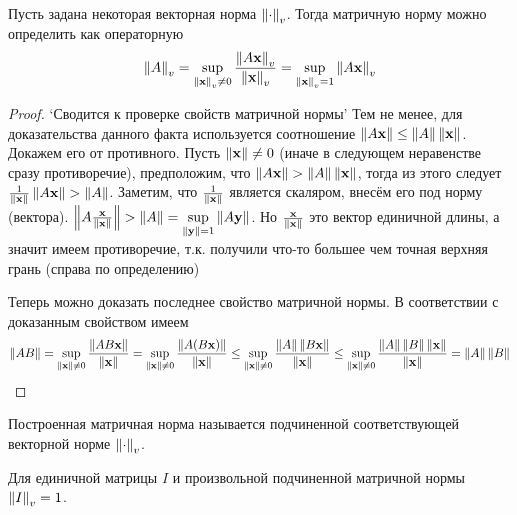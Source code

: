 \begin{lemma}
  Пусть задана некоторая векторная норма $\left\lVert\cdot\right\rVert_v$. Тогда матричную норму можно определить как операторную
  $$
    \left\lVert A\right\rVert_v = \sup_{\left\lVert\mathbf{x}\right\rVert_{v} \neq 0} \frac{\left\lVert A \mathbf{x}\right\rVert_v}{\left\lVert\mathbf{x}\right\rVert_{v}} = \sup_{\left\lVert\mathbf{x}\right\rVert_{v} = 1} \left\lVert A \mathbf{x}\right\rVert_v
  $$
  \begin{proof}
    `Сводится к проверке свойств матричной нормы'
    Тем не менее, для доказательства данного факта используется соотношение $\left\lVert A\mathbf{x}\right\rVert \le \left\lVert A\right\rVert\left\lVert\mathbf{x}\right\rVert$. Докажем его от противного. Пусть $\left\lVert\mathbf{x}\right\rVert \neq 0$ (иначе в следующем неравенстве сразу противоречие), предположим, что $\left\lVert A\mathbf{x}\right\rVert > \left\lVert A\right\rVert\left\lVert\mathbf{x}\right\rVert$, тогда из этого следует $\frac{1}{\left\lVert\mathbf{x}\right\rVert} \left\lVert A\mathbf{x}\right\rVert > \left\lVert A\right\rVert$. Заметим, что $\frac{1}{\left\lVert\mathbf{x}\right\rVert}$ является скаляром, внесём его под норму (вектора). $\left\lVert A \frac{\mathbf{x}}{\left\lVert\mathbf{x}\right\rVert}\right\rVert > \left\lVert A\right\rVert = \sup\limits_{\left\lVert\mathbf{y}\right\rVert = 1} \left\lVert A \mathbf{y}\right\rVert $. Но $\frac{\mathbf{x}}{\left\lVert\mathbf{x}\right\rVert} $ это вектор единичной длины, а значит имеем противоречие, т.к. получили что-то большее чем точная верхняя грань (справа по определению)

    Теперь можно доказать последнее свойство матричной нормы. В соответствии с доказанным свойством имеем
    $$
      \left\lVert AB\right\rVert =
      \sup_{\left\lVert\mathbf{x}\right\rVert \neq 0} \frac{\left\lVert AB \mathbf{x}\right\rVert}{\left\lVert\mathbf{x}\right\rVert} =
      \sup_{\left\lVert\mathbf{x}\right\rVert \neq 0} \frac{\left\lVert A(B\mathbf{x})\right\rVert}{\left\lVert\mathbf{x}\right\rVert} \le
      \sup_{\left\lVert\mathbf{x}\right\rVert \neq 0} \frac{\left\lVert A\right\rVert \left\lVert B\mathbf{x}\right\rVert}{\left\lVert\mathbf{x}\right\rVert} \le
      \sup_{\left\lVert\mathbf{x}\right\rVert \neq 0} \frac{\left\lVert A\right\rVert\left\lVert B\right\rVert \left\lVert\mathbf{x}\right\rVert}{\left\lVert\mathbf{x}\right\rVert} =
      \left\lVert A\right\rVert\left\lVert B\right\rVert
    $$
  \end{proof}
\end{lemma}

\begin{definition}
  Построенная матричная норма называется подчиненной соответствующей векторной норме $\left\lVert\cdot\right\rVert_v$.
\end{definition}

\begin{remark*}
  Для единичной матрицы $I$ и произвольной подчиненной матричной нормы $\left\lVert I\right\rVert_v = 1$.
\end{remark*}

